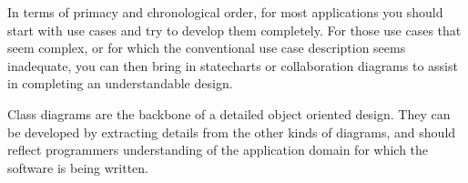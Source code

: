In terms of primacy and chronological order, for most applications you
should start with use cases and try to develop them completely. For
those use cases that seem complex, or for which the conventional use
case description seems inadequate, you can then bring in statecharts or
collaboration diagrams to assist in completing an understandable
design.

Class diagrams are the backbone of a detailed object oriented design.
They can be developed by extracting details from the other kinds of
diagrams, and should reflect programmers{\textquotesingle}
understanding of the application domain for which the software is being
written.

\bigskip

\clearpage
\bigskip
